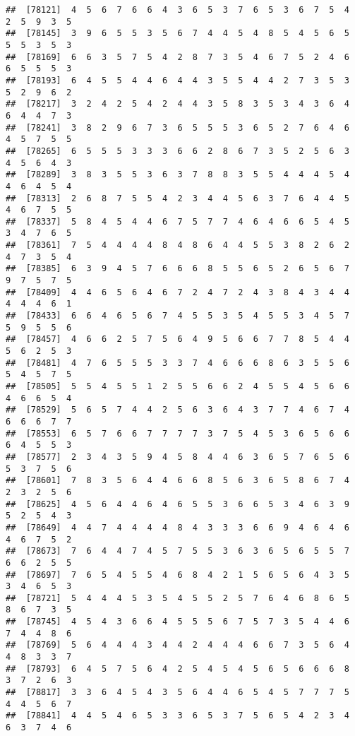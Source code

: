 \documentclass[
]{book}
\begin{document}
\begin{verbatim}
##  [78121]  4  5  6  7  6  6  4  3  6  5  3  7  6  5  3  6  7  5  4  2  5  9  3  5
##  [78145]  3  9  6  5  5  3  5  6  7  4  4  5  4  8  5  4  5  6  5  5  5  3  5  3
##  [78169]  6  6  3  5  7  5  4  2  8  7  3  5  4  6  7  5  2  4  6  6  5  5  5  3
##  [78193]  6  4  5  5  4  4  6  4  4  3  5  5  4  4  2  7  3  5  3  5  2  9  6  2
##  [78217]  3  2  4  2  5  4  2  4  4  3  5  8  3  5  3  4  3  6  4  6  4  4  7  3
##  [78241]  3  8  2  9  6  7  3  6  5  5  5  3  6  5  2  7  6  4  6  4  5  7  5  5
##  [78265]  6  5  5  5  3  3  3  6  6  2  8  6  7  3  5  2  5  6  3  4  5  6  4  3
##  [78289]  3  8  3  5  5  3  6  3  7  8  8  3  5  5  4  4  4  5  4  4  6  4  5  4
##  [78313]  2  6  8  7  5  5  4  2  3  4  4  5  6  3  7  6  4  4  5  4  6  7  5  5
##  [78337]  5  8  4  5  4  4  6  7  5  7  7  4  6  4  6  6  5  4  5  3  4  7  6  5
##  [78361]  7  5  4  4  4  4  8  4  8  6  4  4  5  5  3  8  2  6  2  4  7  3  5  4
##  [78385]  6  3  9  4  5  7  6  6  6  8  5  5  6  5  2  6  5  6  7  9  7  5  7  5
##  [78409]  4  4  6  5  6  4  6  7  2  4  7  2  4  3  8  4  3  4  4  4  4  4  6  1
##  [78433]  6  6  4  6  5  6  7  4  5  5  3  5  4  5  5  3  4  5  7  5  9  5  5  6
##  [78457]  4  6  6  2  5  7  5  6  4  9  5  6  6  7  7  8  5  4  4  5  6  2  5  3
##  [78481]  4  7  6  5  5  5  3  3  7  4  6  6  6  8  6  3  5  5  6  5  4  5  7  5
##  [78505]  5  5  4  5  5  1  2  5  5  6  6  2  4  5  5  4  5  6  6  4  6  6  5  4
##  [78529]  5  6  5  7  4  4  2  5  6  3  6  4  3  7  7  4  6  7  4  6  6  6  7  7
##  [78553]  6  5  7  6  6  7  7  7  7  3  7  5  4  5  3  6  5  6  6  6  4  5  5  3
##  [78577]  2  3  4  3  5  9  4  5  8  4  4  6  3  6  5  7  6  5  6  5  3  7  5  6
##  [78601]  7  8  3  5  6  4  4  6  6  8  5  6  3  6  5  8  6  7  4  2  3  2  5  6
##  [78625]  4  5  6  4  4  6  4  6  5  5  3  6  6  5  3  4  6  3  9  5  2  5  4  3
##  [78649]  4  4  7  4  4  4  4  8  4  3  3  3  6  6  9  4  6  4  6  4  6  7  5  2
##  [78673]  7  6  4  4  7  4  5  7  5  5  3  6  3  6  5  6  5  5  7  6  6  2  5  5
##  [78697]  7  6  5  4  5  5  4  6  8  4  2  1  5  6  5  6  4  3  5  3  4  6  5  3
##  [78721]  5  4  4  4  5  3  5  4  5  5  2  5  7  6  4  6  8  6  5  8  6  7  3  5
##  [78745]  4  5  4  3  6  6  4  5  5  5  6  7  5  7  3  5  4  4  6  7  4  4  8  6
##  [78769]  5  6  4  4  4  3  4  4  2  4  4  4  6  6  7  3  5  6  4  4  8  3  3  7
##  [78793]  6  4  5  7  5  6  4  2  5  4  5  4  5  6  5  6  6  6  8  3  7  2  6  3
##  [78817]  3  3  6  4  5  4  3  5  6  4  4  6  5  4  5  7  7  7  5  4  4  5  6  7
##  [78841]  4  4  5  4  6  5  3  3  6  5  3  7  5  6  5  4  2  3  4  6  3  7  4  6

\end{verbatim}
\end{document}
